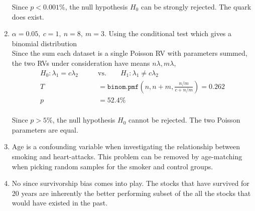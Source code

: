 \begin{enumerate}
	Since $ p < 0.001\% $, the null hypothesis $ H_0 $ can be strongly rejected. The quark does exist.\\
	
	
	\item $\alpha = 0.05,\ c = 1,\ n = 8,\ m = 3$. Using the conditional test which gives a binomial distribution\\
	Since the sum each dataset is a single Poisson RV with parameters summed, the two RVs under consideration have means $ n\lambda, m\lambda $,\\  
	\begin{align}
		H_0 : \lambda_1 = c\lambda_2 \qquad &\text{vs.} \qquad H_1 : \lambda_1 \neq c\lambda_2 \nonumber \\
		T &= \texttt{binom.pmf}\left(n, n+m, \frac{n/m}{c + n/m}\right) = 0.262 \nonumber \\[1ex]
		p &= 52.4\%
	\end{align}\\
	
	Since $ p > 5\% $, the null hypothesis $ H_0 $ cannot be rejected. The two Poisson parameters are equal.\\
	
	\item Age is a confounding variable when investigating the relationship between smoking and heart-attacks. This problem can be removed by age-matching when picking random samples for the smoker and control groups. \\
	
	\item No since survivorship bias comes into play. The stocks that have survived for 20 years are inherently the better performing subset of the all the stocks that would have existed in the past.\\
	
\end{enumerate}
